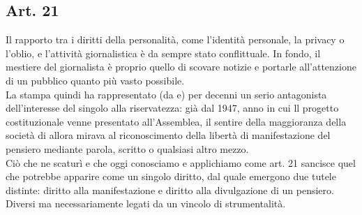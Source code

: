 \subsection{Art. 21}
Il rapporto tra i diritti della personalità, come l'identità personale, la privacy o l'oblio, e l'attività giornalistica è da sempre stato conflittuale.
In fondo, il mestiere del giornalista è proprio quello di scovare notizie e portarle all'attenzione di un pubblico quanto più vasto possibile.
\\La stampa quindi ha rappresentato (da e) per decenni un serio antagonista dell'interesse del singolo alla riservatezza: già dal 1947, anno in cui ll progetto costituzionale venne presentato all'Assemblea, il sentire della maggioranza della società di allora mirava al riconoscimento della libertà di manifestazione del pensiero mediante parola, scritto o qualsiasi altro mezzo.
\\Ciò che ne scaturì e che oggi conosciamo e applichiamo come art. 21 sancisce quel che potrebbe apparire come un singolo diritto, dal quale emergono due tutele distinte: diritto alla manifestazione e diritto alla divulgazione di un pensiero. 
\\Diversi ma necessariamente legati da un vincolo di strumentalità.

